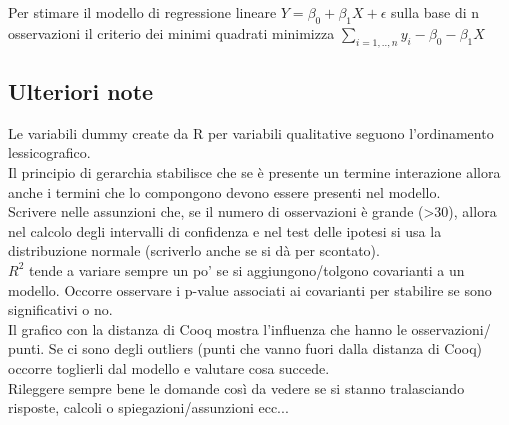 Per stimare il modello di regressione lineare $Y = \beta_0 + \beta_1X + \epsilon$ sulla
base di n osservazioni il criterio dei minimi quadrati minimizza $\sum_{i=1,..,n} y_i - \beta_0 - \beta_1X$

\subsection{Ulteriori note}

Le variabili dummy create da R per variabili qualitative seguono
l'ordinamento lessicografico.\\

Il principio di gerarchia stabilisce che se è presente un termine
interazione allora anche i termini che lo compongono devono essere presenti
nel modello.\\

Scrivere nelle assunzioni che, se il numero di osservazioni è grande (>30),
allora nel calcolo degli intervalli di confidenza e nel test delle ipotesi
si usa la distribuzione normale (scriverlo anche se si dà per scontato).\\

$R^2$ tende a variare sempre un po' se si aggiungono/tolgono covarianti a un
modello. Occorre osservare i p-value associati ai covarianti per stabilire se
sono significativi o no.\\

Il grafico con la distanza di Cooq mostra l'influenza che hanno le osservazioni/
punti. Se ci sono degli outliers (punti che vanno fuori dalla distanza di Cooq)
occorre toglierli dal modello e valutare cosa succede.\\

Rileggere sempre bene le domande così da vedere se si stanno tralasciando 
risposte, calcoli o spiegazioni/assunzioni ecc...
